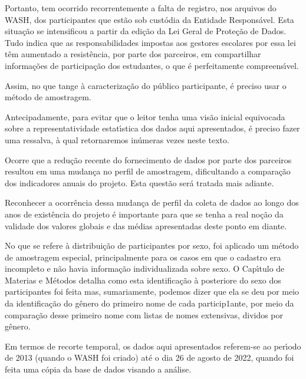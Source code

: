 \documentclass[
12pt,		%
openright,	%
twoside,  %
a4paper,			%
chapter=TITLE,		%
english,			%
french,				%
spanish,			%
brazil				%
]{USPSC-classe/USPSC}
\begin{document}
Portanto, tem ocorrido recorrentemente a falta de registro, nos arquivos do WASH, dos participantes que est\~ao sob cust\'odia da Entidade Respons\'avel. Esta situa\c{c}\~ao se intensificou a partir da edi\c{c}\~ao da Lei Geral de Prote\c{c}\~ao de Dados. Tudo indica que as responsabilidades impostas aos gestores escolares por essa lei t\^em aumentado a  resist\^encia, por parte dos parceiros, em compartilhar informa\c{c}\~oes de participa\c{c}\~ao dos estudantes, o que \'e perfeitamente compreens\'{\i}vel.




Assim, no que tange \`a caracteriza\c{c}\~ao do p\'ublico participante, \'e preciso usar o m\'etodo de amostragem.




Antecipadamente, para evitar que o leitor tenha uma vis\~ao inicial equivocada sobre a representatividade estat\'{\i}stica dos dados aqui apresentados, \'e preciso fazer uma ressalva, \`a qual retornaremos in\'umeras vezes neste texto.




Ocorre que a redu\c{c}\~ao recente do fornecimento de dados por parte dos parceiros resultou em uma mudan\c{c}a no perfil de amostragem, dificultando a compara\c{c}\~ao dos indicadores anuais do projeto. Esta quest\~ao ser\'a tratada mais adiante.




Reconhecer a ocorr\^encia dessa mudan\c{c}a de perfil da coleta de dados ao longo dos anos de exist\^encia do projeto \'e importante para que se tenha a real no\c{c}\~ao da validade dos valores globais e das m\'edias apresentadas deste ponto em diante.




No que se refere \`a distribui\c{c}\~ao de participantes por sexo, foi aplicado um m\'etodo de amostragem especial, principalmente para os casos em que o cadastro era incompleto e n\~ao havia informa\c{c}\~ao individualizada sobre sexo. O Cap\'{\i}tulo de Materias e M\'etodos detalha como esta identifica\c{c}\~ao \`a posteriore do sexo dos participantes foi feita mas, sumariamente, podemos dizer que ela se deu por meio da identifica\c{c}\~ao do g\^enero do primeiro nome de cada particip1ante, por meio da compara\c{c}\~ao desse primeiro nome com listas de nomes extensivas, dividos por g\^enero.




Em termos de recorte temporal, os dados aqui apresentados referem-se ao per\'{\i}odo de 2013 (quando o WASH foi criado) at\'e o dia 26 de agosto de 2022, quando foi feita uma c\'opia da base de dados visando a an\'alise.
\end{document}
